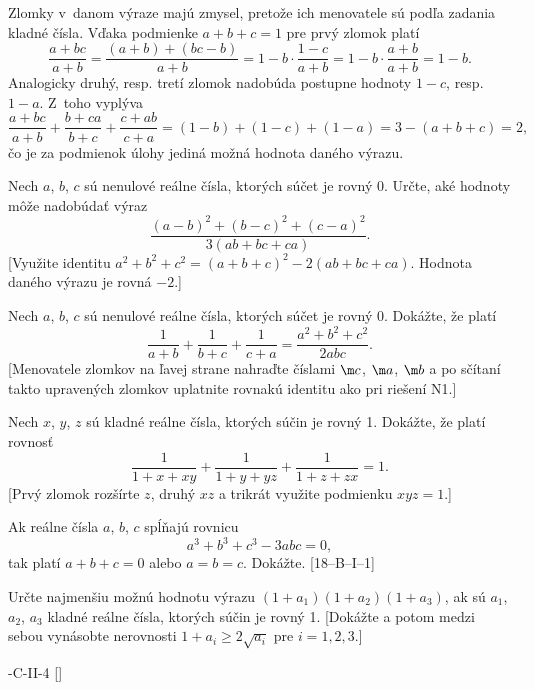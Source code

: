 {%
Zlomky v~danom výraze majú zmysel, pretože ich
menovatele sú podľa zadania kladné čísla. Vďaka podmienke $a+b+c=1$ pre
prvý zlomok platí
$$\frac{a+bc}{a+b}=\frac{(a+b)+(bc-b)}{a+b}=1-b\cdot\frac{1-c}{a+b}=
1-b\cdot\frac{a+b}{a+b}=1-b.$$
Analogicky druhý, resp. tretí zlomok nadobúda postupne hodnoty $1-c$,
resp. $1-a$. Z~toho vyplýva
$$\frac{a+bc}{a+b}+\frac{b+ca}{b+c}+\frac{c+ab}{c+a}=(1-b)+(1-c)+(1-a)=3-(a+b+c)=2,$$
čo je za podmienok úlohy jediná možná hodnota daného výrazu.


Nech $a$, $b$, $c$ sú nenulové reálne čísla, ktorých súčet
je rovný 0. Určte, aké hodnoty môže nadobúdať výraz
$$\frac{(a-b)^2+(b-c)^2+(c-a)^2}{3(ab+bc+ca)}.$$
[Využite identitu $a^2+b^2+c^2=(a+b+c)^2-2(ab+bc+ca)$.
Hodnota daného výrazu je rovná ${-2}$.]

Nech $a$, $b$, $c$ sú nenulové reálne čísla, ktorých súčet
je rovný 0. Dokážte, že platí
$$\frac{1}{a+b}+\frac{1}{b+c}+\frac{1}{c+a}=\frac{a^2+b^2+c^2}{2abc}.$$
[Menovatele zlomkov na ľavej strane nahraďte číslami $\m c$,
$\m a$, $\m b$ a po sčítaní takto upravených zlomkov uplatnite
rovnakú identitu ako pri riešení N1.]

Nech $x$, $y$, $z$ sú kladné reálne čísla, ktorých
súčin je rovný 1. Dokážte, že platí rovnosť
$$\frac{1}{1+x+xy}+\frac{1}{1+y+yz}+\frac{1}{1+z+zx}=1.$$
[Prvý zlomok rozšírte $z$, druhý $xz$ a trikrát využite
podmienku $xyz=1$.]

\DOP
Ak reálne čísla $a$, $b$, $c$ spĺňajú rovnicu
$$a^3+b^3+c^3-3abc=0,$$
tak platí $a+b+c=0$ alebo $a=b=c$. Dokážte.
[18--B--I--1]

Určte najmenšiu možnú hodnotu výrazu $(1+a_1)(1+a_2)(1+a_3)$, ak sú $a_1$, $a_2$, $a_3$ kladné reálne čísla, ktorých súčin je rovný 1. [Dokážte a potom medzi sebou vynásobte nerovnosti $1+a_i\ge2\sqrt{a_i}$ pre $i=1,2,3$.]

-C-II-4
[]

}

